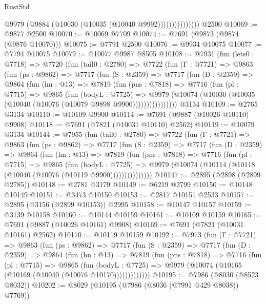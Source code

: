 \begin{lexlean}{RustStd}
\begin{coremodule}
                        @9979 (@9884 (@10030 (@10035 (@10040 @9992)))))))))))))))
    @2500
@10069 := @9877 @2500
@10070 := @10069 @7709
@10074 := @7691 (@9873 (@9874 (@9876 @10070)))
@10075 := @7791 @2500
@10076 := @9934 @10075
@10077 := @7794 @10075
@10079 := @10077 @9987 @8505
@10108 := @7931
    (fun (lets0 : @7718) =>
    @7720
      (fun (tail0 : @2780) =>
      @7722
        (fun (Γ : @7721) =>
        @9863
          (fun (ps : @9862) =>
          @7717
            (fun (S : @2359) =>
            @7717
              (fun (D : @2359) =>
              @9864
                (fun (hn : @13) =>
                @7819
                  (fun (pns : @7818) =>
                  @7716
                    (fun (pl : @7715) =>
                    @9865
                      (fun (bodyL : @7725) =>
                      @9979
                        (@10074 (@10030 (@10035 (@10040 (@10076 (@10079 @9898 @9900))))))))))))))))
    @3134
@10109 := @2765 @3134
@10110 := @10109 @9900
@10114 := @7691 (@9887 (@10026 @10110) @9908)
@10118 := @7691 (@7821 (@10031 @10110) @2562)
@10119 := @10079 @3134
@10144 := @7955
    (fun (tail0 : @2780) =>
    @7722
      (fun (Γ : @7721) =>
      @9863
        (fun (ps : @9862) =>
        @7717
          (fun (S : @2359) =>
          @7717
            (fun (D : @2359) =>
            @9864
              (fun (hn : @13) =>
              @7819
                (fun (pns : @7818) =>
                @7716
                  (fun (pl : @7715) =>
                  @9865
                    (fun (bodyL : @7725) =>
                    @9979 (@10074 (@10114 (@10118 (@10040 (@10076 (@10119 @9900)))))))))))))))
@10147 := @2895 (@2898 (@2899 @2785))
@10148 := @2781 @3179
@10149 := @6219 @2799
@10150 := @10148 @10149
@10151 := @3473 @10150
@10153 := @2817 @10151 @2533
@10157 := @2895 (@3156 (@2899 @10153)) @2995
@10158 := @10147 @10157
@10159 := @3139 @10158
@10160 := @10144 @10159
@10161 := @10109 @10159
@10165 := @7691 (@9887 (@10026 @10161) @9908)
@10169 := @7691 (@7821 (@10031 @10161) @2562)
@10170 := @10119 @10159
@10192 := @7973
    (fun (Γ : @7721) =>
    @9863
      (fun (ps : @9862) =>
      @7717
        (fun (S : @2359) =>
        @7717
          (fun (D : @2359) =>
          @9864
            (fun (hn : @13) =>
            @7819
              (fun (pns : @7818) =>
              @7716
                (fun (pl : @7715) =>
                @9865
                  (fun (bodyL : @7725) =>
                  @9979 (@10074 (@10165 (@10169 (@10040 (@10076 @10170)))))))))))))
@10195 := @7986 (@8030 (@8523 @8032))
@10202 := @8029 (@10195 (@7986 (@8036 (@7991 @429 @8038)) @7769))

\end{coremodule}
\end{lexlean}
